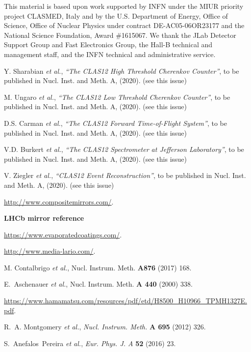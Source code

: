 \documentclass[5p,times,twocolumn]{elsarticle}
\def\etal{{\it et al.}}
\begin{document}
This material is based upon work supported by INFN under the MIUR priority project CLASMED, Italy and by the
U.S. Department of Energy, Office of Science, Office of Nuclear Physics under contract DE-AC05-06OR23177 and
the National Science Foundation, Award \#1615067. We thank the JLab Detector Support Group and Fast Electronics
Group, the Hall-B technical and management staff, and the INFN technical and administrative service.

\begin{thebibliography}{00}
Y. Sharabian {\it et al.}, {\it ``The CLAS12 High Threshold Cherenkov Counter''}, to be published in Nucl. Inst.
and Meth. A, (2020). (see this issue)
  
M. Ungaro {\it et al.}, {\it ``The CLAS12 Low Threshold Cherenkov Counter''}, to be published in Nucl. Inst.
and Meth. A, (2020). (see this issue)

D.S. Carman {\it et al.}, {\it ``The CLAS12 Forward Time-of-Flight System''}, to be published in Nucl. Inst.
and Meth. A, (2020). (see this issue)
  
V.D. Burkert {\it et al.}, {\it ``The CLAS12 Spectrometer at Jefferson Laboratory''}, to be published in Nucl. Inst.
and Meth. A, (2020). (see this issue)
  
V. Ziegler {\it et al.}, {\it ``CLAS12 Event Reconstruction''}, to be published in Nucl. Inst.
and Meth. A, (2020). (see this issue)
  
 \url{http://www.compositemirrors.com/}.

 {\bf LHCb mirror reference}

 \url{https://www.evaporatedcoatings.com/}.

 \url{http://www.media-lario.com/}.

 M. Contalbrigo {\it et al.}, Nucl. Instrum. Meth. {\bf A876} (2017) 168.

 E.~Aschenauer  {\it et al.}, Nucl. Instrum. Meth. {\bf A 440} (2000) 338.

 \url{https://www.hamamatsu.com/resources/pdf/etd/H8500\_H10966\_TPMH1327E.pdf}.
  
 R.~A. Montgomery \etal, {\em Nucl. Instrum. Meth.} {\bf A 695} (2012) 326.

 S.~Anefalos~Pereira \etal, {\em Eur. Phys. J. A} {\bf 52} (2016) 23.


\end{thebibliography}
\end{document}
